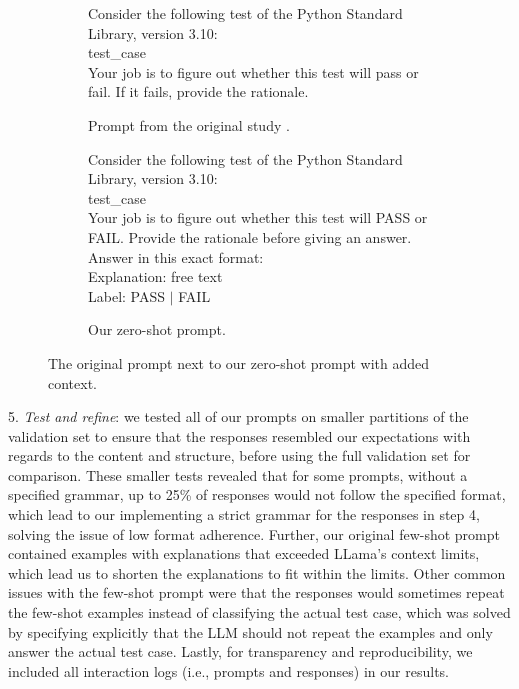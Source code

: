 \documentclass[a4paper]{article}
\newcommand{\infobox}[2]{
	\begin{tcolorbox}[
		skin=widget,
		boxrule=1mm,
		coltitle=black,
		colframe=darkishgray,
		colback=lightergray,
		width=(\linewidth),
		before=\hfill,
		after=\hfill,
		before skip=1pt,
		adjusted title={#1}
		]
		#2
	\end{tcolorbox}
}
\begin{document}
\begin{figure}[H]
	\centering
	\begin{subfigure}[t]{0.48\textwidth}
		\centering
		\vskip 0pt
		\infobox{Original Prompt}{Consider the following test of the Python Standard
			Library, version 3.10:\\
			\textlangle test\_case\textrangle\\
			Your job is to figure out whether this test will pass or
			fail. If it fails, provide the rationale.
			\vspace{1.79cm}}
		\caption[b]{Prompt from the original study \cite{10.1145/3663529.3663794}.}
		\label{fig:original_prompt}
	\end{subfigure}
	\begin{subfigure}[t]{0.48\textwidth}
		\centering
		\vskip 0pt
		\infobox{Our Prompt (Zero-shot)}{Consider the following test of the Python Standard
			Library, version 3.10:\\
			\textlangle test\_case\textrangle\\
			Your job is to figure out whether this test will PASS or
			FAIL. Provide the rationale before giving an answer.\\
			
			Answer in this exact format:\\
			Explanation: \textlangle free text\textrangle\\
			Label: \textlangle PASS $\vert$ FAIL\textrangle}
		\caption[b]{Our zero-shot prompt.}
		\label{fig:zero-shot}
	\end{subfigure}
	\caption{The original prompt next to our zero-shot prompt with added context.}
	\label{fig:prompts_compared}
\end{figure}

5. \textit{Test and refine}: we tested all of our prompts on smaller partitions of the validation set to ensure that the responses resembled our expectations with regards to the content and structure, before using the full validation set for comparison. These smaller tests revealed that for some prompts, without a specified grammar, up to 25\% of responses would not follow the specified format, which lead to our implementing a strict grammar for the responses in step 4, solving the issue of low format adherence. Further, our original few-shot prompt contained examples with explanations that exceeded LLama's context limits, which lead us to shorten the explanations to fit within the limits. Other common issues with the few-shot prompt were that the responses would sometimes repeat the few-shot examples instead of classifying the actual test case, which was solved by specifying explicitly that the LLM should not repeat the examples and only answer the actual test case. Lastly, for transparency and reproducibility, we included all interaction logs (i.e., prompts and responses) in our results.
\end{document}
